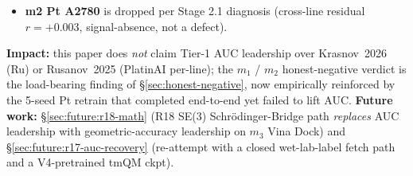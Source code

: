 \begin{enumerate}
\begin{itemize}
    $0.546 \pm 0.003$ (5-seed).
    \item \textbf{m2 Pt A2780} is dropped per Stage 2.1 diagnosis
    (cross-line residual $r = +0.003$, signal-absence, not a defect).
  \end{itemize}
  \textbf{Impact:} this paper does \emph{not} claim Tier-1 AUC
  leadership over Krasnov~2026 (Ru) or Rusanov~2025 (PlatinAI
  per-line); the $m_1$ / $m_2$ honest-negative verdict is the
  load-bearing finding of \S\ref{sec:honest-negative}, now
  empirically reinforced by the 5-seed Pt retrain that completed
  end-to-end yet failed to lift AUC.
  \textbf{Future work:} \S\ref{sec:future:r18-math} (R18 SE(3)
  Schr\"odinger-Bridge path \emph{replaces} AUC leadership with
  geometric-accuracy leadership on $m_3$ Vina Dock) and
  \S\ref{sec:future:r17-auc-recovery} (re-attempt with a closed
  wet-lab-label fetch path and a V4-pretrained tmQM ckpt).


\end{enumerate}
